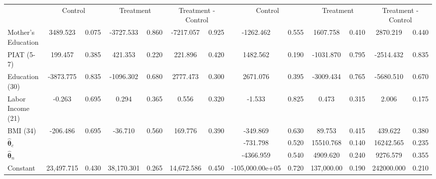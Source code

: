 \begin{tabular}{lcccccccccccc} \toprule
&\multicolumn{2}{c}{Control} & \multicolumn{2}{c}{Treatment} & \multicolumn{2}{c}{Treatment - Control} & \multicolumn{2}{c}{Control} & \multicolumn{2}{c}{Treatment} & \multicolumn{2}{c}{Treatment - Control} \\
Mother's Education &  3489.523 &     0.075 & -3727.533 &     0.860 & -7217.057 &     0.925 & -1262.462 &     0.555 &  1607.758 &     0.410 &  2870.219 &     0.440 \\  
PIAT (5-7) &   199.457 &     0.385 &   421.353 &     0.220 &   221.896 &     0.420 &  1482.562 &     0.190 & -1031.870 &     0.795 & -2514.432 &     0.835 \\  
Education (30) & -3873.775 &     0.835 & -1096.302 &     0.680 &  2777.473 &     0.300 &  2671.076 &     0.395 & -3009.434 &     0.765 & -5680.510 &     0.670 \\  
Labor Income (21) &    -0.263 &     0.695 &     0.294 &     0.365 &     0.556 &     0.320 &    -1.533 &     0.825 &     0.473 &     0.315 &     2.006 &     0.175 \\  
BMI (34) &  -206.486 &     0.695 &   -36.710 &     0.560 &   169.776 &     0.390 &  -349.869 &     0.630 &    89.753 &     0.415 &   439.622 &     0.380 \\  
$\hat{\bm{\theta}}_c$ &         &         &         &         &         &         &  -731.798 &     0.520 & 15510.768 &     0.140 & 16242.565 &     0.235 \\  
$\hat{\bm{\theta}}_n$ &         &         &         &         &         &         & -4366.959 &     0.540 &  4909.620 &     0.240 &  9276.579 &     0.355 \\  
Constant & 23,497.715 &     0.430 & 38,170.301 &     0.265 & 14,672.586 &     0.450 & -105,000.00e+05 &     0.720 &  137,000.00 &     0.190 &  242000.000 &     0.210 \\  
\bottomrule \end{tabular}

